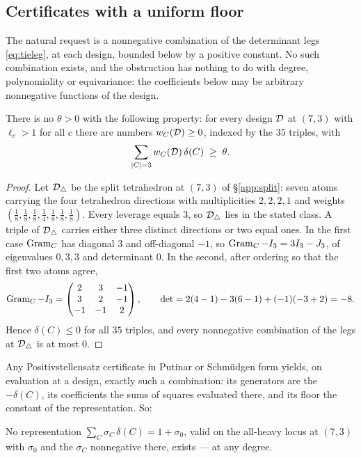 \subsection{Certificates with a uniform floor}\label{app:certificates}

The natural request is a nonnegative combination of the determinant legs
\eqref{eq:tieleg},
at each design, bounded below by a positive constant.  No such
combination exists, and the obstruction has nothing to do with degree,
polynomiality or equivariance: the coefficients below may be arbitrary
nonnegative functions of the design.

\begin{proposition}[Lean]\label{prop:noaggregate}
There is no $\theta>0$ with the following property: for every design $\mathcal{D}$ at
$(7,3)$ with $\ell_c>1$ for all $c$ there are numbers $w_C(\mathcal{D})\ge0$, indexed by
the $35$ triples, with
\[
  \sum_{\lvert C\rvert=3} w_C(\mathcal{D})\,\delta(C)\;\ge\;\theta .
\]
\end{proposition}

\begin{proof}
Let $\mathcal{D}_{\triangle}$ be the split tetrahedron at $(7,3)$ of \S\ref{app:split}: seven
atoms carrying the four tetrahedron directions with multiplicities $2,2,2,1$
and weights $(\tfrac18,\tfrac18,\tfrac18,\tfrac14,\tfrac18,\tfrac18,\tfrac18)$.
Every leverage equals $3$, so $\mathcal{D}_{\triangle}$ lies in the stated class.  A triple of
$\mathcal{D}_{\triangle}$ carries either three distinct directions or two equal ones.  In the
first case $\operatorname{Gram}_C$ has diagonal $3$ and off-diagonal $-1$, so
$\operatorname{Gram}_C-I_3=3I_3-J_3$, of eigenvalues $0,3,3$ and determinant $0$.  In the
second, after ordering so that the first two atoms agree,
\[
  \operatorname{Gram}_C-I_3=\begin{pmatrix}2&3&-1\\ 3&2&-1\\ -1&-1&2\end{pmatrix},
  \qquad \det=2(4-1)-3(6-1)+(-1)(-3+2)=-8 .
\]
Hence $\delta(C)\le0$ for all $35$ triples, and every nonnegative combination
of the legs at $\mathcal{D}_{\triangle}$ is at most $0$.
\end{proof}

Any Positivstellensatz certificate in Putinar or Schm\"udgen form yields, on
evaluation at a design, exactly such a combination: its generators are the
$-\delta(C)$, its coefficients the sums of squares evaluated there, and its
floor the constant of the representation.  So:

\begin{corollary}\label{cor:noputinar}
No representation
$\sum_{C}\sigma_C\,\delta(C)=1+\sigma_0$, valid on the all-heavy locus at
$(7,3)$ with $\sigma_0$ and the $\sigma_C$ nonnegative there, exists --- at any
degree.
\end{corollary}

